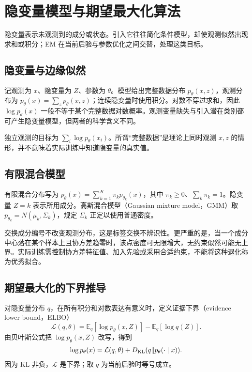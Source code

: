 \setcounter{chapter}{15} %
\chapter{隐变量模型与期望最大化算法}
\label{chap:ml-em}

隐变量表示未观测到的成分或状态。引入它往往简化条件模型，却使观测似然出现求和或积分；EM 在当前后验与参数优化之间交替，处理这类目标。

\section{隐变量与边缘似然}

记观测为 $x$、隐变量为 $Z$、参数为 $\theta$。模型给出完整数据分布 $p_\theta(x,z)$，观测分布为 $p_\theta(x)=\sum_zp_\theta(x,z)$；连续隐变量时使用积分。对数不穿过求和，因此 $\log p_\theta(x)$ 一般不等于某个完整数据对数概率。观测变量缺失与引入潜在类别都可产生隐变量模型，但两者的科学含义不同。

独立观测的目标为 $\sum_i\log p_\theta(x_i)$。所谓“完整数据”是理论上同时观测 $x,z$ 的情形，并不意味着实际训练中知道隐变量的真实值。

\section{有限混合模型}

有限混合分布写为 $p_\theta(x)=\sum_{k=1}^K\pi_kp_{\theta_k}(x)$，其中 $\pi_k\geq0$、$\sum_k\pi_k=1$。隐变量 $Z=k$ 表示所用成分。高斯混合模型（Gaussian mixture model，GMM）取 $p_{\theta_k}=N(\mu_k,\Sigma_k)$，规定 $\Sigma_k$ 正定以使用普通密度。

交换成分编号不改变观测分布，这是标签交换不辨识性。更严重的是，当一个成分中心落在某个样本上且协方差趋零时，该点密度可无限增大，无约束似然可能无上界。实际训练需控制协方差特征值、加入先验或采用合适约束，不能将这种退化称为优秀拟合。

\section{期望最大化的下界推导}

对隐变量分布 $q$，在所有积分和对数表达有意义时，定义证据下界（evidence lower bound，ELBO）
\begin{equation}
 \mathcal L(q,\theta)=\mathbb E_q[\log p_\theta(x,Z)]-\mathbb E_q[\log q(Z)].
 \label{eq:ml-elbo}
\end{equation}
由贝叶斯公式把 $\log p_\theta(x,Z)$ 改写，得到
\[
 \log p_\theta(x)=\mathcal L(q,\theta)
 +D_{\rm KL}(q\Vert p_\theta(\cdot\mid x)).
\]
因为 KL 非负，$\mathcal L$ 是下界；取 $q$ 为当前后验时等号成立。

